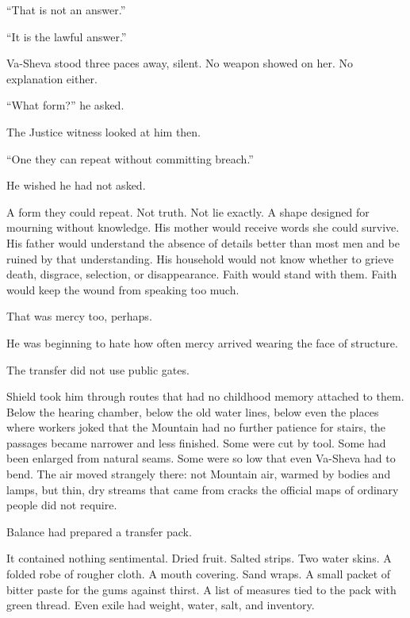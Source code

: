 “That is not an answer.”\par

“It is the lawful answer.”\par

Va-Sheva stood three paces away, silent. No weapon showed on her. No explanation either.\par

“What form?” he asked.\par

The Justice witness looked at him then.\par

“One they can repeat without committing breach.”\par

He wished he had not asked.\par

A form they could repeat. Not truth. Not lie exactly. A shape designed for mourning without knowledge. His mother would receive words she could survive. His father would understand the absence of details better than most men and be ruined by that understanding. His household would not know whether to grieve death, disgrace, selection, or disappearance. Faith would stand with them. Faith would keep the wound from speaking too much.\par

That was mercy too, perhaps.\par

He was beginning to hate how often mercy arrived wearing the face of structure.\par

The transfer did not use public gates.\par

Shield took him through routes that had no childhood memory attached to them. Below the hearing chamber, below the old water lines, below even the places where workers joked that the Mountain had no further patience for stairs, the passages became narrower and less finished. Some were cut by tool. Some had been enlarged from natural seams. Some were so low that even Va-Sheva had to bend. The air moved strangely there: not Mountain air, warmed by bodies and lamps, but thin, dry streams that came from cracks the official maps of ordinary people did not require.\par

Balance had prepared a transfer pack.\par

It contained nothing sentimental. Dried fruit. Salted strips. Two water skins. A folded robe of rougher cloth. A mouth covering. Sand wraps. A small packet of bitter paste for the gums against thirst. A list of measures tied to the pack with green thread. Even exile had weight, water, salt, and inventory.\par

